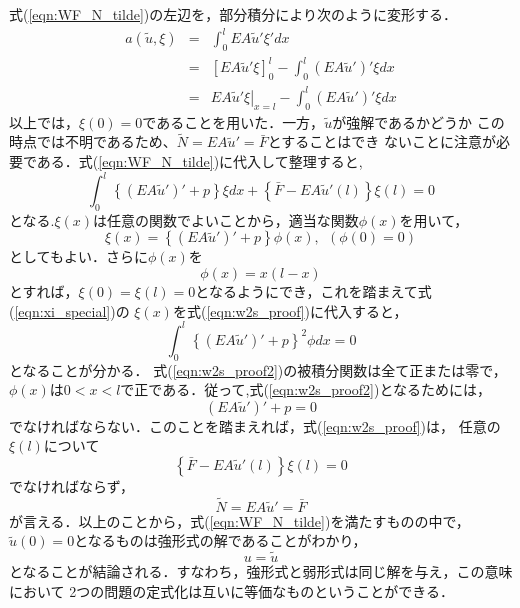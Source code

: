 \documentclass[10pt,a4j]{jarticle}
\begin{document}
式(\ref{eqn:WF_N_tilde})の左辺を，部分積分により次のように変形する．
\begin{eqnarray}
	a(\tilde u, \xi) 
	&=& 
	\int_0^l EA\tilde u' \xi'dx \nonumber \\
	&=& 
	\left[ 
		EA \tilde u'\xi 
	\right]_0^l - \int_0^l (EA\tilde u')'\xi dx
	\nonumber \\
	&=&
	\left. EA \tilde u'\xi \right|_{x=l} - \int_0^l (EA\tilde u')'\xi dx
	\label{eqn:}
\end{eqnarray}
以上では，$\xi(0)=0$であることを用いた．一方，$\tilde u$が強解であるかどうか
この時点では不明であるため、$\tilde N = EA\tilde u'=\bar F$とすることはでき
ないことに注意が必要である．式(\ref{eqn:WF_N_tilde})に代入して整理すると,
\begin{equation}
	\int_0^l \left\{ (EA\tilde u')'+p \right\} \xi dx 
	+ \left\{ \bar F-EA\tilde u'(l) \right\}\xi(l)=0
	\label{eqn:w2s_proof}
\end{equation}
となる.$\xi(x)$は任意の関数でよいことから，適当な関数$\phi(x)$を用いて，
\begin{equation}
	\xi (x) =\left\{ (EA\tilde u')'+p \right\} \phi(x), \ \ (\phi(0)=0)
	\label{eqn:xi_special}
\end{equation}
としてもよい．さらに$\phi(x)$を
\begin{equation}
	\phi(x)= x(l-x)
	\label{eqn:}
\end{equation}
とすれば，$\xi(0)=\xi(l)=0$となるようにでき，これを踏まえて式(\ref{eqn:xi_special})の
$\xi(x)$を式(\ref{eqn:w2s_proof})に代入すると，
\begin{equation}
	\int_0^l \left\{ (EA\tilde u')'+p \right\}^2\phi dx =0
	\label{eqn:w2s_proof2}
\end{equation}
となることが分かる． 式(\ref{eqn:w2s_proof2})の被積分関数は全て正または零で，
$\phi(x)$は$0<x<l$で正である．従って,式(\ref{eqn:w2s_proof2})となるためには，
\begin{equation}
	(EA\tilde u')'+p =0
	\label{eqn:}
\end{equation}
でなければならない．このことを踏まえれば，式(\ref{eqn:w2s_proof})は，
任意の$\xi(l)$について
\begin{equation}
	\left\{ \bar F-EA\tilde u'(l)\right\}\xi(l) =0
	\label{eqn:}
\end{equation}
でなければならず，
\begin{equation}
	\tilde N =EA\tilde u' =\bar F
	\label{eqn:}
\end{equation}
が言える．以上のことから，式(\ref{eqn:WF_N_tilde})を満たすものの中で，
$\tilde u(0)=0$となるものは強形式の解であることがわかり，
\begin{equation}
	u=\tilde u
	\label{eqn:w2s}
\end{equation}
となることが結論される．すなわち，強形式と弱形式は同じ解を与え，この意味において
2つの問題の定式化は互いに等価なものということができる．
\end{document}
